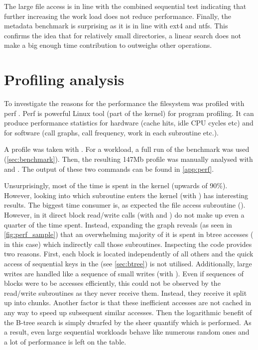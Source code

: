         The large file access is in line with the combined sequential test
        indicating that further increasing the work load does not reduce
        performance. Finally, the metadata benchmark is surprising as it is in
        line with ext4 and ntfs. This confirms the idea that for relatively
        small directories, a linear search does not make a big enough time
        contribution to outweighs other operations.

    \section{Profiling analysis}
        \label{sec:perf}

        To investigate the reasons for the performance the filesystem was
        profiled with perf \cite{perf}. Perf is powerful Linux tool (part of
        the kernel) for program profiling. It can produce performance
        statistics for hardware (cache hits, idle CPU cycles etc) and for
        software (call graphs, call frequency, work in each subroutine etc.).

        A profile was taken with . For a
        workload, a full run of the benchmark was used (\autoref{sec:benchmark}).
        Then, the resulting 147Mb profile was manually analysed with
         and . The output of these two commands can be found in
        \autoref{app:perf}.

        Unsurprisingly, most of the time is spent in the kernel (upwards of
        90\%). However, looking into which subroutine enters the kernel (with
        ) has interesting results. The biggest time
        consumer is, as expected the file access subroutine
        (). However, in it direct block
        read/write calls (with  and
        ) do not make up even a quarter of the time
        spent. Instead, expanding the graph reveals (as seen in
        \autoref{fig:perf_sample}) that an overwhelming majority of it is spent in btree
        accesses ( in this case) which indirectly
        call those subroutines. Inspecting the code provides two reasons.
        First, each block is located independently of all others and the quick
        access of sequential keys in the \bplustree (see \autoref{sec:btree}) is
        not utilised. Additionally, large writes are handled like a sequence of
        small writes (with ). Even if
        sequences of blocks were to be accesses efficiently, this could not be
        observed by the read/write subroutines as they never receive them.
        Instead, they receive it split up into chunks. Another factor is that
        these inefficient accesses are not cached in any way to speed up
        subsequent similar accesses. Then the logarithmic benefit of the B-tree
        search is simply dwarfed by the sheer quantify which is performed. As a
        result, even large sequential workloads behave like numerous random
        ones and a lot of performance is left on the table.

